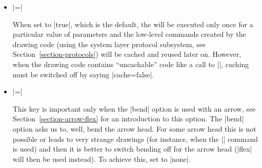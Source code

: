 \begin{command}{\pgfdeclarearrow{}}
\begin{itemize}
            The are some special considerations concerning the :
            \begin{itemize}
                \item In the  you may \emph{not} use |\pgfusepath|
                    since this would try to add arrow tips to the arrow tip and
                    lead to a recursion. Use the ``quick'' versions
                    |\pgfusepathqstroke| and so on instead, which never try to
                    add arrow tips.
                \item If you stroke the path that you construct, you should
                    first set the dashing to solid and set up fixed joins and
                    caps, as needed. This will ensure that the arrow tip will
                    always look the same.
                \item When the arrow tip code is executed, it is automatically
                    put inside a low-level scope, so nothing will ``leak out''
                    from the scope.
                \item The high-level coordinate transformation matrix will be
                    set to the identity matrix when the code is executed for
                    the first time.
            \end{itemize}
        \item {}|=|

            When set to |true|, which is the default, the  will be
            executed only once for a particular value of parameters and the
            low-level commands created by the drawing code (using the system
            layer protocol subsystem, see Section~\ref{section-protocols}) will
            be cached and reused later on. However, when the drawing code
            contains ``uncachable'' code like a call to |\pgftext|, caching
            must be switched off by saying |cache=false|.
        \item {}|=|

            This key is important only when the |bend| option is used with an
            arrow, see Section~\ref{section-arrow-flex} for an introduction to
            this option. The |bend| option asks us to, well, bend the arrow
            head. For some arrow head this is not possible or leads to very
            strange drawings (for instance, when the |\pgftext| command is
            used) and then it is better to switch bending off for the arrow
            head (|flex| will then be used instead). To achieve this, set
             to |none|.


\end{itemize}
\end{command}
